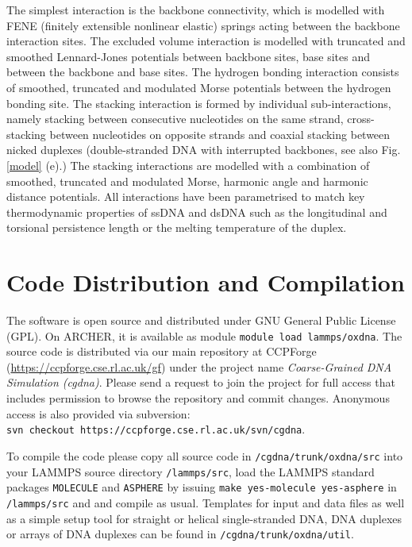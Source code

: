 \documentclass[12pt,onecolumn]{article}
\begin{document}
The simplest interaction is the backbone connectivity, which is modelled with FENE (finitely extensible nonlinear elastic) springs acting between the backbone interaction sites. The excluded volume interaction is modelled with truncated and smoothed Lennard-Jones potentials between backbone sites, base sites and between the backbone and base sites. 
The hydrogen bonding interaction consists of smoothed, truncated and modulated Morse potentials between the hydrogen bonding site.
The stacking interaction is formed by individual sub-interactions, namely stacking between consecutive nucleotides on the same strand, 
cross-stacking between nucleotides on opposite strands and coaxial stacking between nicked duplexes 
(double-stranded DNA with interrupted backbones, see also Fig. \ref{model} (e).) 
The stacking interactions are modelled with a combination of smoothed, truncated and modulated Morse, harmonic angle and harmonic distance potentials. 
All interactions have been parametrised to match key thermodynamic properties of ssDNA and dsDNA such as the longitudinal and torsional persistence 
length or the melting temperature of the duplex.

\section{Code Distribution and Compilation}

The software is open source and distributed under GNU General Public License (GPL). 
On ARCHER, it is available as module \texttt{module load lammps/oxdna}.
The source code is distributed
via our main repository at 
CCPForge (\url{https://ccpforge.cse.rl.ac.uk/gf}) under the project name {\it Coarse-Grained DNA Simulation (cgdna)}.
Please send a request to join the project for full access that includes permission to browse the repository and commit changes. 
Anonymous access is also provided via subversion:\\

\smallskip
\texttt{svn checkout https://ccpforge.cse.rl.ac.uk/svn/cgdna}.\\
\smallskip

\noindent To compile the code please copy all source code in \texttt{/cgdna/trunk/oxdna/src} into your LAMMPS source directory \texttt{/lammps/src}, load the LAMMPS standard packages \texttt{MOLECULE} and \texttt{ASPHERE} 
by issuing  
\texttt{make yes-molecule yes-asphere} in \texttt{/lammps/src} and 
and compile as usual. Templates for input and data files as well as a simple setup tool for straight or helical single-stranded DNA,
DNA duplexes or arrays of DNA duplexes can be found in \texttt{/cgdna/trunk/oxdna/util}.\\  
\end{document}
